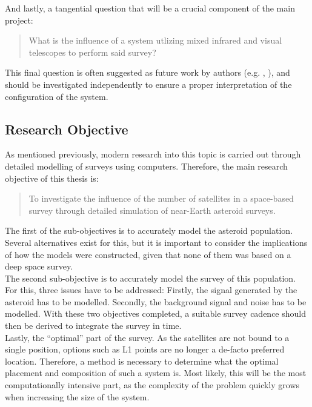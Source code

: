 \documentclass[12pt, english, NoHyper]{AE4010-template}
\begin{document}
And lastly, a tangential question that will be a crucial component of the main project:

\begin{quote}
 What is the influence of a system utlizing mixed infrared and visual telescopes to perform said survey?
\end{quote}

This final question is often suggested as future work by authors (e.g. \cite{AsteroidsInTIR}, \cite{AsteroidSTM}), and should be investigated independently to ensure a proper interpretation of the configuration of the system.

\subsection{Research Objective}
As mentioned previously, modern research into this topic is carried out through detailed modelling of surveys using computers. Therefore, the main research objective of this thesis is:

\begin{quote}
To investigate the influence of the number of satellites in a space-based survey through detailed simulation of near-Earth asteroid surveys.
\end{quote}

The first of the sub-objectives is to accurately model the asteroid population. Several alternatives exist for this, but it is important to consider the implications of how the models were constructed, given that none of them was based on a deep space survey.\\

The second sub-objective is to accurately model the survey of this population. For this, three issues have to be addressed: Firstly, the signal generated by the asteroid has to be modelled. Secondly, the background signal and noise has to be modelled. With these two objectives completed, a suitable survey cadence should then be derived to integrate the survey in time.\\

Lastly, the ``optimal'' part of the survey. As the satellites are not bound to a single position, options such as L1 points are no longer a de-facto preferred location. Therefore, a method is necessary to determine what the optimal placement and composition of such a system is. Most likely, this will be the most computationally intensive part, as the complexity of the problem quickly grows when increasing the size of the system.
\end{document}
